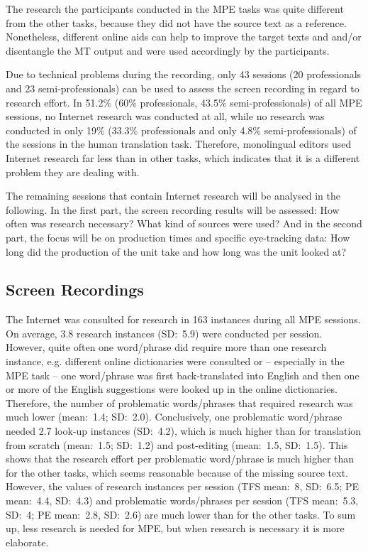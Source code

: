 \documentclass[output=paper]{langsci/langscibook}
\begin{document}
The research the participants conducted in the MPE tasks was quite different from the other tasks, because they did not have the source text as a reference. Nonetheless, different online aids can help to improve the target texts and and/or disentangle the MT output and were used accordingly by the participants.


Due to technical problems during the recording, only 43 sessions (20 professionals and 23 semi-professionals) can be used to assess the screen recording in regard to research effort. In 51.2\% (60\% professionals, 43.5\% semi-professionals) of all MPE sessions, no Internet research was conducted at all, while no research was conducted in only 19\% (33.3\% professionals and only 4.8\% semi-professionals) of the sessions in the human translation task. Therefore, monolingual editors used Internet research far less than in other tasks, which indicates that it is a different problem they are dealing with.



The remaining sessions that contain Internet research will be analysed in the following. In the first part, the screen recording results will be assessed: How often was research necessary? What kind of sources were used? And in the second part, the focus will be on production times and specific eye-tracking data: How long did the production of the unit take and how long was the unit looked at?


\subsection{Screen Recordings\label{nitzke:sec:ScreenRecordings}}

The Internet was consulted for research in 163 instances during all MPE sessions. On average, 3.8 research instances (SD:~5.9) were conducted per session. However, quite often one word/phrase did require more than one research instance, e.g. different online dictionaries were consulted or -- especially in the MPE task -- one word/phrase was first back-translated into English and then one or more of the English suggestions were looked up in the online dictionaries. Therefore, the number of problematic words/phrases that required research was much lower (mean:~1.4; SD:~2.0). Conclusively, one problematic word/phrase needed 2.7 look-up instances (SD:~4.2), which is much higher than for translation from scratch (mean:~1.5; SD:~1.2) and post-editing (mean:~1.5, SD:~1.5). This shows that the research effort per problematic word/phrase is much higher than for the other tasks, which seems reasonable because of the missing source text. However, the values of research instances per session (TFS mean:~8, SD:~6.5; PE mean:~4.4, SD:~4.3) and problematic words/phrases per session (TFS mean:~5.3, SD:~4; PE mean:~2.8, SD:~2.6) are much lower than for the other tasks. To sum up, less research is needed for MPE, but when research is necessary it is more elaborate.
\end{document}
